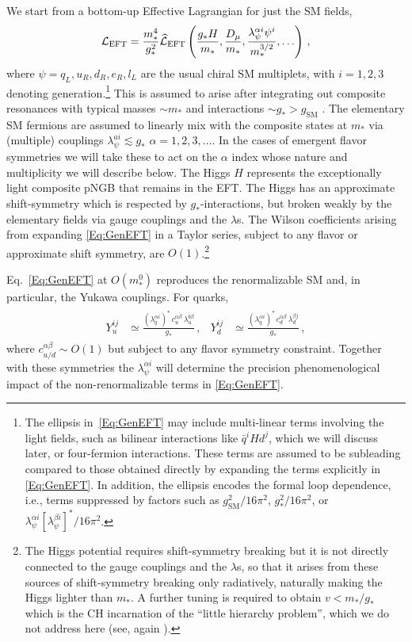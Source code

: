 \documentclass[aps,prl,twocolumn,showpacs,10pt,preprintnumbers,nofootinbib]{revtex4-2}
\newcommand{\gst}{g_*}
\newcommand{\mst}{m_*}
\begin{document}
We start from a bottom-up Effective Lagrangian for just the SM fields,  
\begin{align}\label{Eq:GenEFT}
    {\cal L}_{\rm EFT}=\frac{m_*^4}{g_*^2}\widehat{\cal L}_{\rm EFT}\left(\frac{g_*H}{m_*},\frac{D_\mu}{m_*},\frac{\lambda^{\alpha i}_{\psi} \psi^i}{m_*^{3/2}},\ldots \right)\,,
\end{align}
where $\psi=q_L,u_R,d_R,e_R,l_L$ are the usual chiral SM multiplets, with $i=1,2,3$ denoting generation.\footnote{The ellipsis in~\eqref{Eq:GenEFT} may include multi-linear terms involving the light fields, such as bilinear interactions like $\bar{q}^i H d^j$, which we will discuss later, or four-fermion interactions. These terms are assumed to be subleading compared to those obtained directly by expanding the terms explicitly in \eqref{Eq:GenEFT}. In addition, the ellipsis encodes the formal loop dependence, i.e., terms suppressed by factors such as $g_{\text{SM}}^2/16\pi^2$, $\gst^2/16\pi^2$, or $\lambda_{\psi}^{\alpha i}[\lambda_{\psi}^{\beta i}]^*/16\pi^2$.} This is assumed to arise after integrating out composite resonances with typical masses $\sim \mst$ and interactions $\sim\gst > g_{\text{SM}}$ \cite{Giudice:2007fh}. The elementary SM fermions are assumed to linearly mix with the composite states at $\mst$ via (multiple) couplings $\lambda_{\psi}^{ai}\lesssim\gst$ $\alpha=1,2,3,\ldots$. In the cases of emergent flavor symmetries we will take these to act on the $\alpha$ index whose nature and multiplicity we will describe below. The Higgs $H$ represents the exceptionally light composite pNGB that remains in the EFT. The Higgs has an approximate shift-symmetry which is respected by $\gst$-interactions, but broken weakly by the elementary fields via gauge couplings and the $\lambda$s. The Wilson coefficients arising from expanding \eqref{Eq:GenEFT} in a Taylor series, subject to any flavor or approximate shift symmetry, are $O(1)$.\footnote{The Higgs potential requires shift-symmetry breaking but it is not directly connected to the gauge couplings and the $\lambda$s, so that it arises from these sources of shift-symmetry breaking only radiatively, naturally making the Higgs lighter than $\mst$. A further tuning is required to obtain $v< \mst/\gst$ which is the CH incarnation of the ``little hierarchy problem'', which we do not address here (see, again \cite{Panico:2015jxa}).}

Eq.~\eqref{Eq:GenEFT} at $O(\mst^0)$ reproduces the renormalizable SM and, in particular, the Yukawa couplings. For quarks,
\begin{align}\label{Eq:Yukawa}
\begin{aligned}
    Y_{u}^{ij} &\simeq \frac{(\lambda_{q}^{\alpha i})^*\, c_u^{\alpha \beta}\, \lambda_{u}^{b\beta}}{g_*}\,, &
    Y_{d}^{ij} &\simeq \frac{(\lambda_{q}^{\alpha i})^*\, c_d^{\alpha 
\beta}\, \lambda_{d}^{\beta j}}{g_*}\,,
\end{aligned}
\end{align}
where $c^{\alpha \beta}_{u/d}\sim O(1)$ but subject to any flavor symmetry constraint. Together with these symmetries the $\lambda_{\psi}^{\alpha i}$ will determine the precision phenomenological impact of the non-renormalizable terms in \eqref{Eq:GenEFT}.
\end{document}

